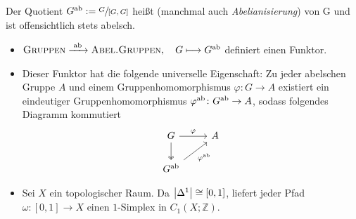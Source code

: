 \begin{definition}[{name=[{Abelisierung}]}]
	Der Quotient $G^{\ab} := \sfrac{G}{[G,G]}$ heißt  (manchmal auch \emph{Abelianisierung}) von G und ist offensichtlich stets abelsch.
\end{definition}

\begin{bemerkung}
	\leavevmode
	\begin{itemize}
		\item $\GRUPPEN \grenzw{\ab} \ABELGRUPPEN , \quad G \longmapsto G^{\ab} $
		definiert einen Funktor.
		\item Dieser Funktor hat die folgende universelle Eigenschaft: Zu jeder abelschen Gruppe $A$ und einem Gruppenhomomorphismus $\varphi \colon G \to A$ existiert ein eindeutiger
		Gruppenhomomorphismus $\varphi^{\ab} \colon G^{\ab} \to A$, sodass folgendes Diagramm kommutiert
		\[
			\begin{tikzcd}
				G \rar["\varphi"] \dar[two heads]& A \\
				G^{\ab} \urar["\varphi^{\ab}"']
			\end{tikzcd}
		\]
		\item Sei $X$ ein topologischer Raum. 
		Da $\abs*{\Delta^1} \cong [0,1]$, liefert jeder Pfad $\omega \colon [0,1] \to X$ einen $1$-Simplex in $C_1(X;\mathbb{Z})$.
	\end{itemize}
\end{bemerkung}

